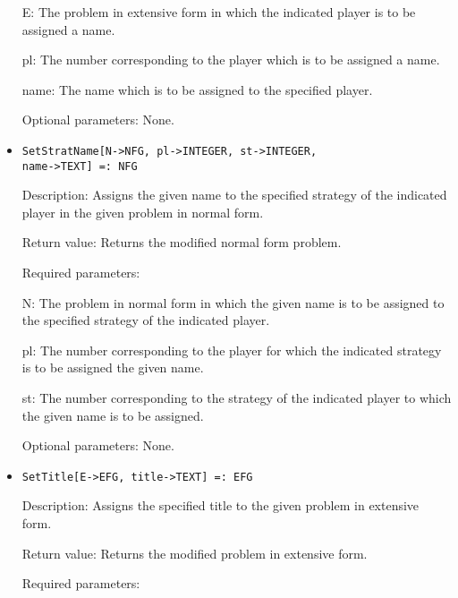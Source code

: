 \begin{itemize}
\bd
\item
[E:] The problem in extensive form in which the indicated player is to
be assigned a name.
\item
[pl:] The number corresponding to the player which is to be assigned a
name.
\item
[name:] The name which is to be assigned to the specified player.
\ed
\item
[Optional parameters:] None.
\ed

\item

\protect \large \begin{verbatim}
SetStratName[N->NFG, pl->INTEGER, st->INTEGER,
name->TEXT] =: NFG
\end{verbatim}\normalsize

\bd
\item
[Description:] Assigns the given name to the specified strategy of the
indicated player in the given problem in normal form.
\item
[Return value:] Returns the modified normal form problem.
\item
[Required parameters:]\hfil\null
	
\bd
\item
[N:] The problem in normal form in which the given name is to be
assigned to the specified strategy of the indicated player.
\item
[pl:] The number corresponding to the player for which the indicated
strategy is to be assigned the given name.
\item
[st:] The number corresponding to the strategy of the indicated player
to which the given name is to be assigned.
\ed

\item
[Optional parameters:] None.

\ed

\item

\protect \large \begin{verbatim}
SetTitle[E->EFG, title->TEXT] =: EFG
\end{verbatim}\normalsize

\bd
\item
[Description:] Assigns the specified title to the given problem in
extensive form.
\item
[Return value:] Returns the modified problem in extensive form.
\item
[Required parameters:]\hfil\null
	

\end{itemize}
